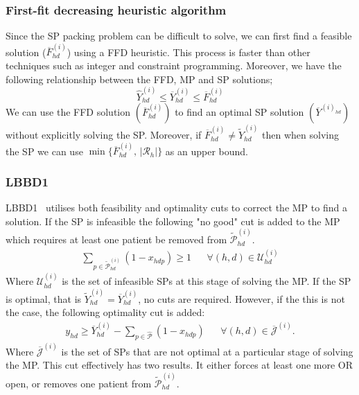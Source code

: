 \subsubsection*{First-fit decreasing heuristic algorithm}
Since the SP packing problem can be difficult to solve, we can first find a feasible solution 
($\overline{F}^{(i)}_{hd}$) using a FFD heuristic. This process is faster than other techniques
such as integer and constraint programming. Moreover, we have the following relationship 
between the FFD, MP and SP solutions;
\begin{equation}
    \hat{Y}^{(i)}_{hd} \leq \overline{Y}^{(i)}_{hd} \leq \overline{F}^{(i)}_{hd}
\end{equation}
We can use the FFD solution $\left(\overline{F}^{(i)}_{hd}\right)$ to find an optimal SP solution 
$\left(\overline{Y}^{(i)_{hd}}\right)$ without explicitly solving the SP. Moreover, if 
$\overline{F}^{(i)}_{hd} \neq \tilde{Y}^{(i)}_{hd}$ then when solving the SP we can use 
$\operatorname{min}\{\overline{F}^{(i)}_{hd},\, |\mathcal{R}_h|\}$ as an upper bound. 

\subsubsection{LBBD1}
LBBD1~\cite{roshanaei2017propagating} utilises both feasibility and optimality cuts to 
correct the MP to find a solution. If the SP is infeasible the following "no good" cut 
is added to the MP which requires at least one patient be removed from 
$\tilde{\mathcal{P}}^{(i)}_{hd}$.
\begin{align}
    \sum\limits_{p \in \tilde{\mathcal{P}}^{(i)}_{hd}}(1-x_{hdp})\geq 1 
        && \forall (h,d) \in \mathcal{U}_{hd}^{(i)}
\end{align}
Where $\mathcal{U}_{hd}^{(i)}$ is the set of infeasible SPs at this stage of solving the MP.
If the SP is optimal, that is $\tilde{Y}^{(i)}_{hd} = \overline{Y}^{(i)}_{hd}$, no cuts
are required. However, if the this is not the case, the following optimality cut is added:
\begin{align*}
    y_{hd} \geq \overline{Y}_{hd}^{(i)} - \sum\limits_{p \in \hat{\mathcal{P}}}(1-x_{hdp}) && \forall (h,d) \in \overline{\mathcal{J}}^{(i)}.
\end{align*}
Where $\overline{\mathcal{J}}^{(i)}$ is the set of SPs that are not optimal at a particular stage of solving the MP. This cut effectively has two results. It either forces at least one more OR open, or removes one patient from $\tilde{\mathcal{P}}^{(i)}_{hd}$.
